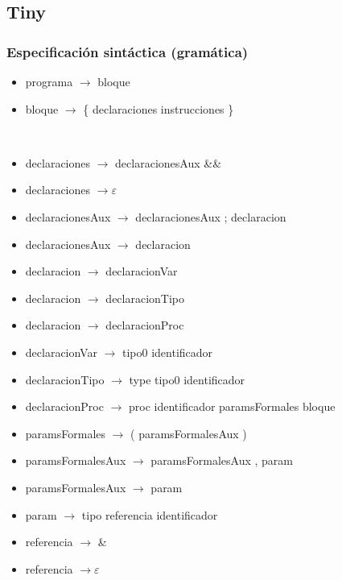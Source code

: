 \documentclass[11pt]{article}
\begin{document}
        \subsection{Tiny}
        \subsubsection{Especificación sintáctica (gramática)}
        \begin{itemize}
            \item programa $\rightarrow$ bloque
            \item bloque $\rightarrow$ \{ declaraciones instrucciones \}
        \end{itemize}
        \
        \begin{itemize}
            \item declaraciones $\rightarrow$ declaracionesAux \&\&
            \item declaraciones $\rightarrow \varepsilon$
            \item declaracionesAux $\rightarrow$ declaracionesAux ; declaracion
            \item declaracionesAux $\rightarrow$ declaracion
            \item declaracion $\rightarrow$ declaracionVar
            \item declaracion $\rightarrow$ declaracionTipo
            \item declaracion $\rightarrow$ declaracionProc
            \item declaracionVar $\rightarrow$ tipo0 identificador
            \item declaracionTipo $\rightarrow$ type tipo0 identificador
            \item declaracionProc $\rightarrow$ proc identificador paramsFormales bloque
            \item paramsFormales $\rightarrow$ ( paramsFormalesAux )
            \item paramsFormalesAux $\rightarrow$ paramsFormalesAux , param
            \item paramsFormalesAux $\rightarrow$ param
            \item param $\rightarrow$ tipo referencia identificador
            \item referencia $\rightarrow$ \&
            \item referencia $\rightarrow \varepsilon$
        \end{itemize}
        \
\end{document}
